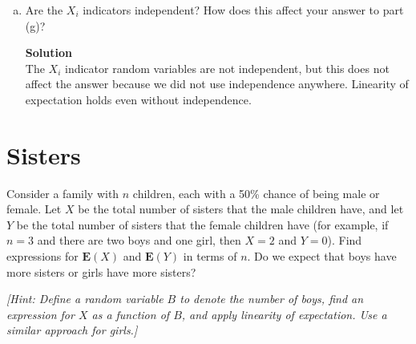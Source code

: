 \documentclass[11pt]{article}
\newcommand*{\Question}[1]{\section{#1}}
\newenvironment{Answer}{\vspace{10pt}\begin{mdframed}\textbf{Solution}\\}{\end{mdframed}\vfill\pagebreak[3]}
\newenvironment{Answer}{\vspace{10pt}}{\vfill\pagebreak[3]}
\newcommand*{\E}{\textbf{E}}
\begin{document}
\begin{enumerate}[(a)]
\begin{Answer}
$=\frac{4}{52}*\frac{3}{51}+\frac{48}{52}*\frac{4}{51}$\\
$\Pr(X_3)=\Pr(X_3|\neg X_1\cap X_2)\Pr(\neg X_1 \cap X_2)+\Pr(X_3|X_1\cap \neg X_2)\Pr(X_1 \cap \neg X_2)+\Pr(X_3|\neg X_1\cap \neg X_2)\Pr(\neg X_1 \cap \neg X_2)+\Pr(X_3|X_1\cap X_2)\Pr(X_1 \cap X_2)$\\
$=\Pr(X_3)=\Pr(X_3 \cap \neg X_1\cap X_2)+\Pr(X_3 \cap X_1\cap \neg X_2)+\Pr(X_3 \cap \neg X_1\cap \neg X_2)+\Pr(X_3 \cap X_1\cap X_2)$\\
$=\frac{4}{52}*\frac{3}{51}*\frac{2}{50}+\frac{4}{52}*\frac{48}{51}*\frac{3}{50}+\frac{4}{52}*\frac{48}{51}*\frac{3}{50}+\frac{48}{52}*\frac{47}{51}*\frac{4}{50}$\\
$=\frac{24+12*48+12*48+13*48*47}{50*51*52} \approx 0.231$
    \end{Answer}
    \item Are the $X_i$ indicators independent? How does this affect your answer to part (g)?
    \begin{Answer}
The $X_i$ indicator random variables are not independent, but this does not affect the answer because we did not use independence anywhere. Linearity of expectation holds even without independence. 
    \end{Answer}
\end{enumerate}


\Question{Sisters}

Consider a family with $n$ children, each with a 50\% chance of being male or female. Let $X$ be the total number of sisters that the male children have, and let $Y$ be the total number of sisters that the female children have (for example, if $n = 3$ and there are two boys and one girl, then $X = 2$ and $Y = 0$). Find expressions for $\E(X)$ and $\E(Y)$ in terms of $n$. Do we expect that boys have more sisters or girls have more sisters?

\textit{[Hint: Define a random variable $B$ to denote the number of boys, find an expression for $X$ as a function of $B$, and apply linearity of expectation. Use a similar approach for girls.]}
\end{document}
